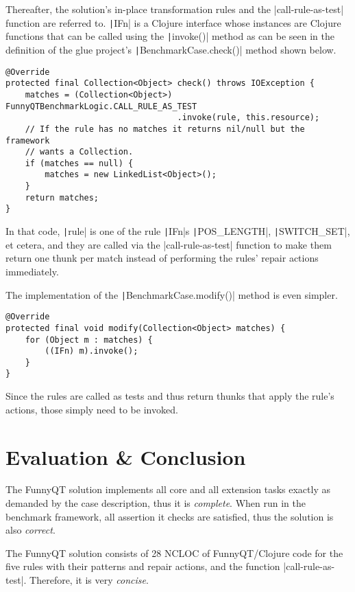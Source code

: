 \documentclass[submission]{eptcs}
\newcommand{\code}{\clojureinline}
\begin{document}
Thereafter, the solution's in-place transformation rules and the
\code|call-rule-as-test| function are referred to.  \texttt|IFn| is a
Clojure interface whose instances are Clojure functions that can be called
using the \texttt|invoke()| method as can be seen in the definition
of the glue project's \texttt|BenchmarkCase.check()| method shown
below.

\begin{verbatim}
@Override
protected final Collection<Object> check() throws IOException {
    matches = (Collection<Object>) FunnyQTBenchmarkLogic.CALL_RULE_AS_TEST
                                   .invoke(rule, this.resource);
    // If the rule has no matches it returns nil/null but the framework
    // wants a Collection.
    if (matches == null) {
        matches = new LinkedList<Object>();
    }
    return matches;
}
\end{verbatim}

In that code, \texttt|rule| is one of the rule
\texttt|IFn|s \texttt|POS_LENGTH|,
\texttt|SWITCH_SET|, et cetera, and they are called via the
\code|call-rule-as-test| function to make them return one thunk per match
instead of performing the rules' repair actions immediately.

The implementation of the \texttt|BenchmarkCase.modify()| method is
even simpler.

\begin{verbatim}
@Override
protected final void modify(Collection<Object> matches) {
    for (Object m : matches) {
        ((IFn) m).invoke();
    }
}
\end{verbatim}

Since the rules are called as tests and thus return thunks that apply the
rule's actions, those simply need to be invoked.


\section{Evaluation \& Conclusion}
\label{sec:evaluation}

The FunnyQT solution implements all core and all extension tasks exactly as
demanded by the case description, thus it is \emph{complete}.  When run in the
benchmark framework, all assertion it checks are satisfied, thus the solution
is also \emph{correct}.

The FunnyQT solution consists of 28 NCLOC of FunnyQT/Clojure code for the five
rules with their patterns and repair actions, and the function
\code|call-rule-as-test|.  Therefore, it is very \emph{concise}.
\end{document}
